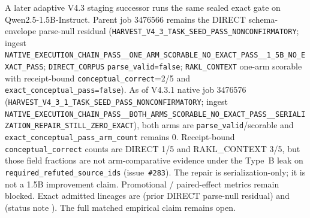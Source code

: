 A later adaptive V4.3 staging successor runs the same sealed exact gate on
Qwen2.5-1.5B-Instruct.  Parent job 3476566 remains the DIRECT schema-envelope
parse-null residual
(\texttt{HARVEST\_V4\_3\_TASK\_SEED\_PASS\_NONCONFIRMATORY}; ingest
\texttt{NATIVE\_EXECUTION\_CHAIN\_PASS\_\_ONE\_ARM\_SCORABLE\_NO\_EXACT\_PASS\_\_1\_5B\_NO\_EXACT\_PASS};
\texttt{DIRECT\_CORPUS} \texttt{parse\_valid=false}; \texttt{RAKL\_CONTEXT}
one-arm scorable with receipt-bound \texttt{conceptual\_correct}=2/5 and
\texttt{exact\_conceptual\_pass=false}).  As of
V4.3.1 native job 3476576
(\texttt{HARVEST\_V4\_3\_1\_TASK\_SEED\_PASS\_NONCONFIRMATORY}; ingest
\texttt{NATIVE\_EXECUTION\_CHAIN\_PASS\_\_BOTH\_ARMS\_SCORABLE\_NO\_EXACT\_PASS\_\_SERIALIZATION\_REPAIR\_STILL\_ZERO\_EXACT}),
both arms are \texttt{parse\_valid}/scorable and
\texttt{exact\_conceptual\_pass\_arm\_count} remains 0.  Receipt-bound
\texttt{conceptual\_correct} counts are DIRECT 1/5 and RAKL\_CONTEXT 3/5, but
those field fractions are not arm-comparative evidence under the Type~B leak
on \texttt{required\_refuted\_source\_ids} (issue~\texttt{\#283}).  The repair is
serialization-only; it is not a 1.5B improvement claim.  Promotional /
paired-effect metrics remain blocked.  Exact admitted lineages are
(prior DIRECT parse-null residual) and
(status note
).
The full matched empirical claim remains open.
